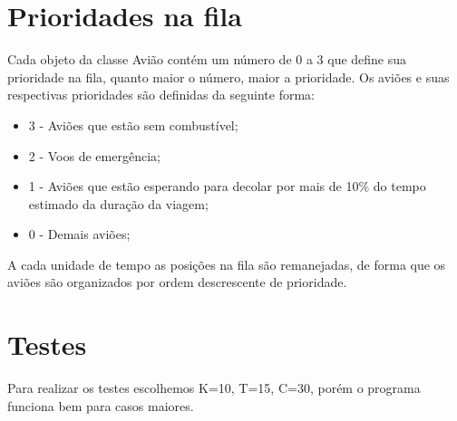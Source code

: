 \documentclass{article}
\begin{document}
\section{Prioridades na fila}
Cada objeto da classe Avião contém um número de 0 a 3 que define sua prioridade na fila, quanto maior o número, maior a prioridade. Os aviões e suas respectivas prioridades são definidas da seguinte forma:

\begin{itemize}
\item 3 - Aviões que estão sem combustível;
\item 2 - Voos de emergência;
\item 1 - Aviões que estão esperando para decolar por mais de 10\% do tempo estimado da duração da viagem;
\item 0 - Demais aviões;
\end{itemize}

A cada unidade de tempo as posições na fila são remanejadas, de forma que os aviões são organizados por ordem descrescente de prioridade.

\section{Testes}
Para realizar os testes escolhemos K=10, T=15, C=30, porém o programa funciona bem para casos maiores.
\end{document}

